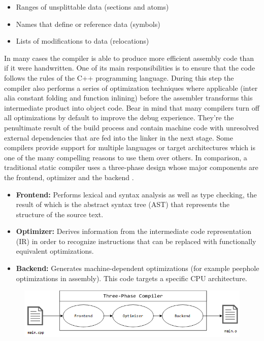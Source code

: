 \begin{itemize}
    \item Ranges of unsplittable data (sections and atoms)
    \item Names that define or reference data (symbols)
    \item Lists of modifications to data (relocations)
\end{itemize}

In many cases the compiler is able to produce more efficient assembly code than
if it were handwritten. One of its main responsibilities is to ensure that the code
follows the rules of the C++ programming language. During this step the compiler
also performs a series of optimization techniques where applicable (inter alia
constant folding and function inlining) before the assembler transforms this intermediate
product into object code. Bear in mind that many compilers turn off all optimizations
by default to improve the debug experience. They're the penultimate result of the
build process and contain machine code with unresolved external dependencies that
are fed into the linker in the next stage. Some compilers provide support for multiple
languages or target architectures which is one of the many compelling reasons to
use them over others. In comparison, a traditional static compiler uses a three-phase
design whose major components are the frontend, optimizer and the backend \autocite{lattner2011}.

\begin{itemize}
    \item \textbf{Frontend:} Performs lexical and syntax analysis as well as type
    checking, the result of which is the abstract syntax tree (AST) that represents
    the structure of the source text.
    \item \textbf{Optimizer:} Derives information from the intermediate code
    representation (IR) in order to recognize instructions that can be replaced
    with functionally equivalent optimizations.
    \item \textbf{Backend:} Generates machine-dependent optimizations (for example
    peephole optimizations in assembly). This code targets a specific CPU architecture. 
\end{itemize}

\begin{figure}[hbt!]
    \centering
    \includegraphics[width=1\textwidth]{images/ThreePhaseDesign.png}
\end{figure}

